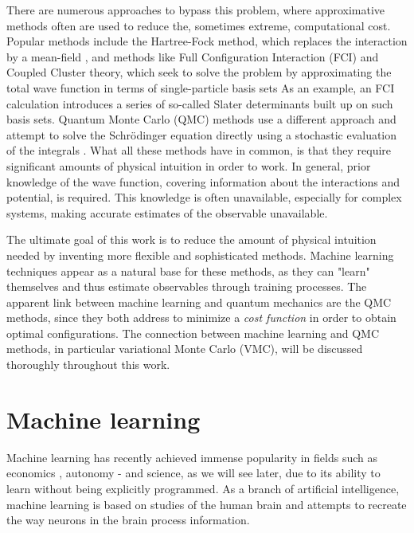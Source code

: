 There are numerous approaches to bypass this problem, where approximative methods often are used to reduce the, sometimes extreme, computational cost. Popular methods include the Hartree-Fock method, which replaces the interaction by a mean-field \supercite{hartree_wave_1928, fock_selfconsistent_1930}, and methods like Full Configuration Interaction (FCI) and Coupled Cluster theory, which seek to solve the problem by approximating the total wave function in terms of single-particle basis sets \supercite{daniel_crawford_introduction_2007} As an example, an FCI calculation introduces a series of so-called Slater determinants built up on such basis sets. Quantum Monte Carlo (QMC) methods use a different approach and attempt to solve the Schrödinger equation directly using a stochastic evaluation of the integrals \supercite{bajdich_electronic_2010}. What all these methods have in common, is that they require significant amounts of physical intuition in order to work. In general, prior knowledge of the wave function, covering information about the interactions and potential, is required. This knowledge is often unavailable, especially for complex systems, making accurate estimates of the observable unavailable. 

The ultimate goal of this work is to reduce the amount of physical intuition needed by inventing more flexible and sophisticated methods. Machine learning techniques appear as a natural base for these methods, as they can "learn" themselves and thus estimate observables through training processes. The apparent link between machine learning and quantum mechanics are the QMC methods, since they both address to minimize a \textit{cost function} in order to obtain optimal configurations. The connection between machine learning and QMC methods, in particular variational Monte Carlo (VMC), will be discussed thoroughly throughout this work.

\section{Machine learning} \label{sec:machinelearning}
Machine learning has recently achieved immense popularity in fields such as economics \supercite{dube_scalable_2017}, autonomy \supercite{chernova_interactive_2009} - and science, as we will see later, due to its ability to learn without being explicitly programmed. As a branch of artificial intelligence, machine learning is based on studies of the human brain and attempts to recreate the way neurons in the brain process information.

